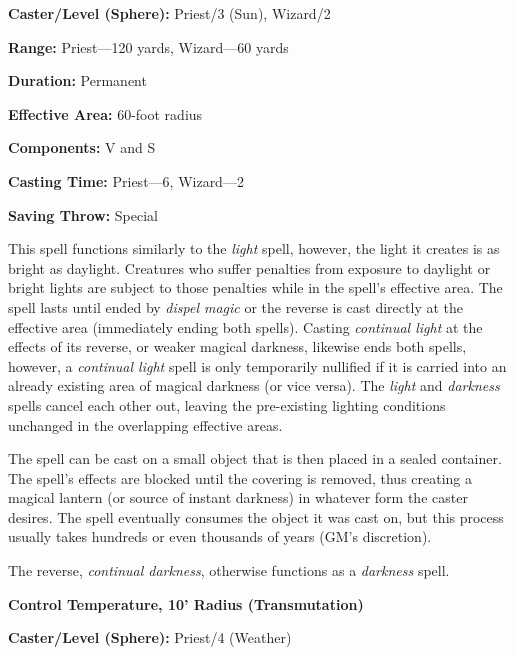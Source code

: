 \begin{multicols}{2}
\begin{minipage}{\columnwidth}
\noindent \textbf{Caster/Level (Sphere):} Priest/3 (Sun), Wizard/2

\noindent \textbf{Range:} Priest---120 yards, Wizard---60 yards

\noindent \textbf{Duration:} Permanent

\noindent \textbf{Effective Area:} 60-foot radius

\noindent \textbf{Components:} V and S

\noindent \textbf{Casting Time:} Priest---6, Wizard---2

\noindent \textbf{Saving Throw:} Special

\end{minipage}

This spell functions similarly to the \textit{light} spell, however, the light it creates is as bright as daylight.  Creatures who suffer penalties from exposure to daylight or bright lights are subject to those penalties while in the spell's effective area.  The spell lasts until ended by \textit{dispel magic} or the reverse is cast directly at the effective area (immediately ending both spells).  Casting \textit{continual light} at the effects of its reverse, or weaker magical darkness, likewise ends both spells, however, a \textit{continual light} spell is only temporarily nullified if it is carried into an already existing area of magical darkness (or vice versa).  The \textit{light} and \textit{darkness} spells cancel each other out, leaving the pre-existing lighting conditions unchanged in the overlapping effective areas.  

The spell can be cast on a small object that is then placed in a sealed container.  The spell's effects are blocked until the covering is removed, thus creating a magical lantern (or source of instant darkness) in whatever form the caster desires.  The spell eventually consumes the object it was cast on, but this process usually takes hundreds or even thousands of years (GM's discretion).

The reverse, \textit{continual darkness}, otherwise functions as a \textit{darkness} spell.  

\vspace{1em}

\noindent
\begin{minipage}{\columnwidth}

\noindent \textbf{Control Temperature, 10' Radius (Transmutation)}

\noindent \textbf{Caster/Level (Sphere):} Priest/4 (Weather)


\end{minipage}
\end{multicols}

